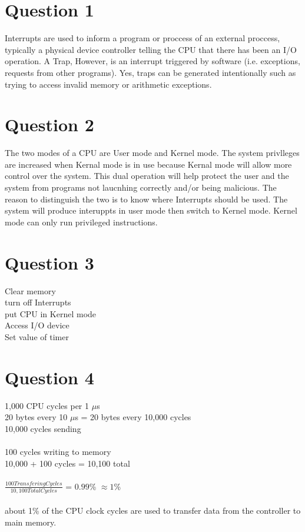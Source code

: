 \documentclass[11pt]{article}
\begin{document}
\maketitle


\section*{Question 1}
Interrupts are used to inform a program or proccess
of an external proccess, typically a physical 
device controller telling the CPU that there has 
been an I/O operation. A Trap, However, is an interrupt 
triggered by software (i.e. exceptions, requests
from other programs). Yes, traps can be generated 
intentionally such as trying to access invalid memory
or arithmetic exceptions.

\section*{Question 2}
The two modes of a CPU are User mode and Kernel mode.
The system privlleges are increased when Kernal mode
is in use because Kernal mode will allow more control
over the system. This dual operation will help protect
the user and the system from programs not laucnhing 
correctly and/or being malicious. The reason to 
distinguish the two is to know where Interrupts
should be used. The system will produce interuppts 
in user mode then switch to Kernel mode. Kernel mode 
can only run privileged instructions.

\section*{Question 3}
Clear memory\\
turn off Interrupts\\
put CPU in Kernel mode\\
Access I/O device\\
Set value of timer

\section*{Question 4}
1,000 CPU cycles per 1 $\mu$s\\
20 bytes every 10 $\mu$s = 20 bytes every 10,000 cycles\\
10,000 cycles sending\\\\
100 cycles writing to memory\\
10,000 + 100 cycles = 10,100 total\\\\
\( \frac{100 Transfering Cycles}
{10,100 Total Cycles} \) = $0.99$\% $\approx 1$\%\\\\
about 1\% of the CPU clock cycles are used to 
transfer data from the controller to main memory.
\end{document}
